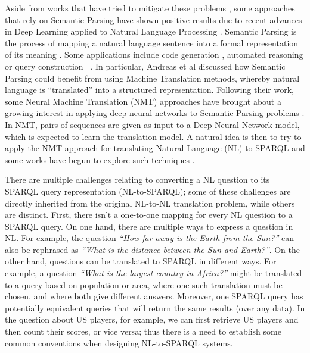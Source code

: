 Aside from works that have tried to mitigate these problems \cite{semPar:lexical-gap-HakimovUWC15, semPar:complex-queries-GliozzoK12}, some approaches 
that rely on Semantic Parsing have shown positive results due to recent advances in Deep 
Learning applied to Natural Language Processing \cite{semPar:sempar-as-mt-AndreasVC13}. Semantic Parsing is the process of 
mapping a natural language sentence into a formal representation of its meaning \cite{semPar:sempar-as-mt-AndreasVC13}. Some 
applications include code generation \cite{semPar:code-gen-RabinovichSK17, semPar:tranx-code-gen-YinN18}, 
automated reasoning \cite{semPar:ITPKaliszykUV17} or query construction ~\cite{semPar:txt-to-sql-RadevKZZFRS18}. 
In particular, Andreas et al \cite{semPar:sempar-as-mt-AndreasVC13} discussed how Semantic Parsing could benefit from using 
Machine Translation methods, whereby natural language is “translated” into a structured 
representation. Following their work, some Neural Machine Translation (NMT) approaches 
have brought about a growing interest in applying deep neural networks to Semantic Parsing 
problems \cite{nmt:CaiXZYLL18, nmt:DongL16, nmt:ZhongCoRR17}. In NMT, pairs of sequences are given as input to a Deep Neural Network 
model, which is expected to learn the translation model. A natural idea is then to try to apply 
the NMT approach for translating Natural Language (NL) to SPARQL and some works have begun to explore such techniques \cite{nmt:CoRRLuz18, nmt:nspm-SoruMMPVEN17, nmt:CoRRSoru18}.

There are multiple challenges relating to converting a NL question to its SPARQL query 
representation (NL-to-SPARQL); some of these challenges are directly inherited from the 
original NL-to-NL translation problem, while others are distinct. First, there isn’t a one-to-one 
mapping for every NL question to a SPARQL query. On one hand, there are multiple ways to 
express a question in NL. For example, the question \textit{“How far away is the Earth from the Sun?”} 
can also be rephrased as \textit{“What is the distance between the Sun and Earth?”}. On the other 
hand, questions can be translated to SPARQL in different ways. For example, a question \textit{“What 
is the largest country in Africa?”} might be translated to a query based on population or area, 
where one such translation must be chosen, and where both give different answers. Moreover, 
one SPARQL query has potentially equivalent queries that will return the same results (over any 
data). In the question about US players, for example, we can first retrieve US players and then 
count their scores, or vice versa; thus there is a need to establish some common conventions 
when designing NL-to-SPARQL systems. 

